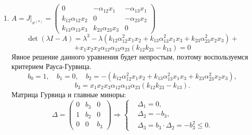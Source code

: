 \begin{enumerate}
        \item \(
            A = J \big|_{x^{(4)}} = \left(\begin{matrix}
                0 & -\alpha_{12} x_1 & -\alpha_{13} x_1 \\
                k_{12} \alpha_{12} x_2 & 0 & -\alpha_{23} x_2 \\
                k_{13} \alpha_{13} x_3 & k_{23} \alpha_{23} x_3 & 0
            \end{matrix}\right)
        \)
        \[
            \det(\lambda I - A) = \lambda^3 - \lambda (k_{12} \alpha_{12}^2 x_1 x_2 + k_{13} \alpha_{13}^2 x_1 x_3 + k_{23} \alpha_{23}^2 x_2 x_3) +
        \]
        \[
            + x_1 x_2 x_3 \alpha_{12} \alpha_{13} \alpha_{23} (k_{12} k_{23} - k_{13}) = 0
        \]
        Явное решение данного уравнения будет непростым, поэтому воспользуемся критерием Рауса-Гурвица.
        \[
            b_0 = 1, \quad b_1 = 0, \quad b_2 = -(k_{12} \alpha_{12}^2 x_1 x_2 + k_{13} \alpha_{13}^2 x_1 x_3 + k_{23} \alpha_{23}^2 x_2 x_3),
        \]
        \[
            b_3 = x_1 x_2 x_3 \alpha_{12} \alpha_{13} \alpha_{23} (k_{12} k_{23} - k_{13}).
        \]
        Матрица Гурвица и главные миноры:
        \[
            \Delta = \left( \begin{matrix}
                0 & b_3 & 0 \\
                1 & b_2 & 0 \\
                0   & 0 & b_3
            \end{matrix} \right)
            \Rightarrow 
            \left\{ \begin{split}
                & \Delta_1 = 0, \\
                & \Delta_2 = -b_3, \\
                & \Delta_3 = b_3 \cdot \Delta_2 = -b_3^2 \leq 0.
            \end{split} \right.
        \]
    \end{enumerate}